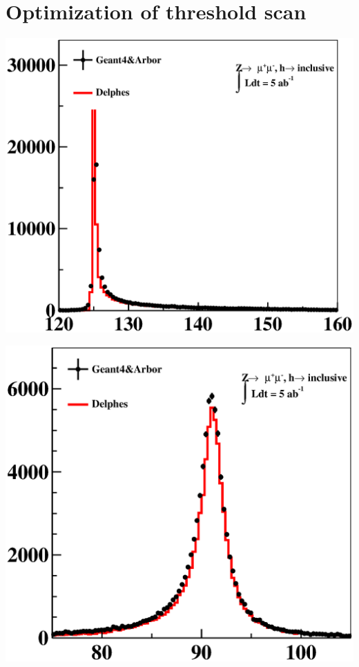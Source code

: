 \documentclass[a4paper,10pt,twoside]{cpc-hepnp}
\begin{document}
\section{Optimization of threshold scan  \label{sec:optimization}}

\iffalse
\begin{center}
\includegraphics[width=0.9\linewidth]{e2e2h_reco}
\end{center}
\begin{center}
\includegraphics[width=0.9\linewidth]{e2e2h_mass}
\end{center}
\end{document}
